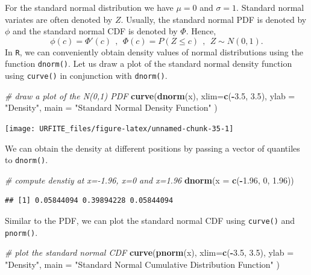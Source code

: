 \documentclass[]{book}
\newenvironment{Shaded}{\begin{snugshade}}{\end{snugshade}}
\newcommand{\KeywordTok}[1]{\textcolor[rgb]{0.13,0.29,0.53}{\textbf{#1}}}
\newcommand{\DataTypeTok}[1]{\textcolor[rgb]{0.13,0.29,0.53}{#1}}
\newcommand{\DecValTok}[1]{\textcolor[rgb]{0.00,0.00,0.81}{#1}}
\newcommand{\FloatTok}[1]{\textcolor[rgb]{0.00,0.00,0.81}{#1}}
\newcommand{\StringTok}[1]{\textcolor[rgb]{0.31,0.60,0.02}{#1}}
\newcommand{\CommentTok}[1]{\textcolor[rgb]{0.56,0.35,0.01}{\textit{#1}}}
\newcommand{\OperatorTok}[1]{\textcolor[rgb]{0.81,0.36,0.00}{\textbf{#1}}}
\newcommand{\NormalTok}[1]{#1}
\theoremstyle{definition}
\theoremstyle{definition}
\theoremstyle{definition}
\theoremstyle{remark}
\begin{document}
For the standard normal distribution we have \(\mu=0\) and \(\sigma=1\).
Standard normal variates are often denoted by \(Z\). Usually, the
standard normal PDF is denoted by \(\phi\) and the standard normal CDF
is denoted by \(\Phi\). Hence,
\[ \phi(c) = \Phi'(c) \ \ , \ \ \Phi(c) = P(Z \leq c) \ \ , \ \ Z \sim N(0,1).\]
In \texttt{R}, we can conveniently obtain density values of normal
distributions using the function \texttt{dnorm()}. Let us draw a plot of
the standard normal density function using \texttt{curve()} in
conjunction with \texttt{dnorm()}.

\begin{Shaded}
\begin{Highlighting}[]
\CommentTok{# draw a plot of the N(0,1) PDF}
\KeywordTok{curve}\NormalTok{(}\KeywordTok{dnorm}\NormalTok{(x),}
      \DataTypeTok{xlim=}\KeywordTok{c}\NormalTok{(}\OperatorTok{-}\FloatTok{3.5}\NormalTok{, }\FloatTok{3.5}\NormalTok{),}
      \DataTypeTok{ylab =} \StringTok{"Density"}\NormalTok{, }
      \DataTypeTok{main =} \StringTok{"Standard Normal Density Function"}
\NormalTok{      ) }
\end{Highlighting}
\end{Shaded}

\begin{center}\texttt{[image: URFITE\_files/figure-latex/unnamed-chunk-35-1]} \end{center}

We can obtain the density at different positions by passing a vector of
quantiles to \texttt{dnorm()}.

\begin{Shaded}
\begin{Highlighting}[]
\CommentTok{# compute denstiy at x=-1.96, x=0 and x=1.96}
\KeywordTok{dnorm}\NormalTok{(}\DataTypeTok{x =} \KeywordTok{c}\NormalTok{(}\OperatorTok{-}\FloatTok{1.96}\NormalTok{, }\DecValTok{0}\NormalTok{, }\FloatTok{1.96}\NormalTok{))}
\end{Highlighting}
\end{Shaded}

\begin{verbatim}
## [1] 0.05844094 0.39894228 0.05844094
\end{verbatim}

Similar to the PDF, we can plot the standard normal CDF using
\texttt{curve()} and \texttt{pnorm()}.

\begin{Shaded}
\begin{Highlighting}[]
\CommentTok{# plot the standard normal CDF}
\KeywordTok{curve}\NormalTok{(}\KeywordTok{pnorm}\NormalTok{(x), }
      \DataTypeTok{xlim=}\KeywordTok{c}\NormalTok{(}\OperatorTok{-}\FloatTok{3.5}\NormalTok{, }\FloatTok{3.5}\NormalTok{), }
      \DataTypeTok{ylab =} \StringTok{"Density"}\NormalTok{, }
      \DataTypeTok{main =} \StringTok{"Standard Normal Cumulative Distribution Function"}
\NormalTok{      )}
\end{Highlighting}
\end{Shaded}
\end{document}
